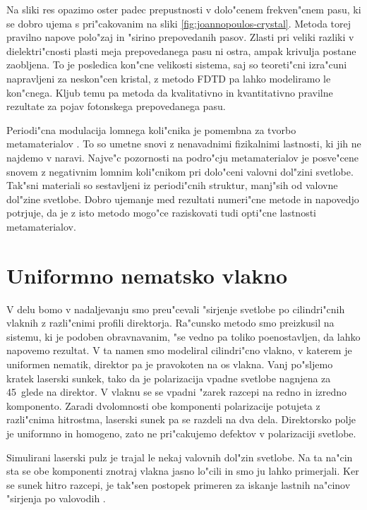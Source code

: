 \documentclass[12pt,twoside,openright,final]{report}
\begin{document}
Na sliki res opazimo oster padec prepustnosti v dolo"cenem frekven"cnem pasu, ki se dobro ujema s pri"cakovanim na sliki \ref{fig:joannopoulos-crystal}. 
Metoda torej pravilno napove polo"zaj in "sirino prepovedanih pasov. 
Zlasti pri veliki razliki v dielektri"cnosti plasti meja prepovedanega pasu ni ostra, ampak krivulja postane zaobljena. 
To je posledica kon"cne velikosti sistema, saj so teoreti"cni izra"cuni napravljeni za neskon"cen kristal, z metodo \acs{FDTD} pa lahko modeliramo le kon"cnega. 
Kljub temu pa metoda da kvalitativno in kvantitativno pravilne rezultate za pojav fotonskega prepovedanega pasu. 

Periodi"cna modulacija lomnega koli"cnika je pomembna za tvorbo metamaterialov \cite{metamaterials}. 
To so umetne snovi z nenavadnimi fizikalnimi lastnosti, ki jih ne najdemo v naravi. 
Najve"c pozornosti na podro"cju metamaterialov je posve"cene snovem z negativnim lomnim koli"cnikom pri dolo"ceni valovni dol"zini svetlobe. 
Tak"sni materiali so sestavljeni iz periodi"cnih struktur, manj"sih od valovne dol"zine svetlobe. 
Dobro ujemanje med rezultati numeri"cne metode in napovedjo potrjuje, da je z isto metodo mogo"ce raziskovati tudi opti"cne lastnosti metamaterialov. 

\section{Uniformno nematsko vlakno}
V delu bomo v nadaljevanju smo preu"cevali "sirjenje svetlobe po cilindri"cnih vlaknih z razli"cnimi profili direktorja. 
Ra"cunsko metodo smo preizkusil na sistemu, ki je podoben obravnavanim, "se vedno pa toliko poenostavljen, da lahko napovemo rezultat. 
V ta namen smo modeliral cilindri"cno vlakno, v katerem je uniformen nematik, direktor pa je pravokoten na os vlakna. 
Vanj po"sljemo kratek laserski sunkek, tako da je polarizacija vpadne svetlobe nagnjena za 45\degree~glede na direktor. 
V vlaknu se se vpadni "zarek razcepi na redno in izredno komponento. 
Zaradi dvolomnosti obe komponenti polarizacije potujeta z razli"cnima hitrostma, laserski sunek pa se razdeli na dva dela. 
Direktorsko polje je uniformno in homogeno, zato ne pri"cakujemo defektov v polarizaciji svetlobe. 

Simulirani laserski pulz je trajal le nekaj valovnih dol"zin svetlobe. 
Na ta na"cin sta se obe komponenti znotraj vlakna jasno lo"cili in smo ju lahko primerjali. 
Ker se sunek hitro razcepi, je tak"sen postopek primeren za iskanje lastnih na"cinov "sirjenja po valovodih \cite{taflove}. 
\end{document}
